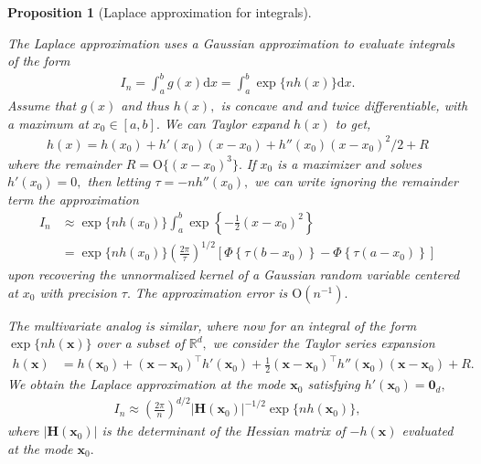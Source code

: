 \documentclass[
  11pt,
  letterpaper,
]{scrbook}
\theoremstyle{plain}
\newtheorem{proposition}{Proposition}[chapter]
\theoremstyle{definition}
\theoremstyle{definition}
\theoremstyle{plain}
\theoremstyle{plain}
\theoremstyle{definition}
\theoremstyle{remark}
\begin{document}
\begin{proposition}[Laplace approximation for
integrals]\protect\hypertarget{prp-Laplace-approximation}{}\label{prp-Laplace-approximation}

The Laplace approximation uses a Gaussian approximation to evaluate
integrals of the form \begin{align*}
I_n= \int_a^b g(x) \mathrm{d} x =\int_a^b  \exp\{nh(x)\}\mathrm{d} x.
\end{align*} Assume that \(g(x)\) and thus \(h(x),\) is concave and and
twice differentiable, with a maximum at \(x_0 \in [a,b].\) We can Taylor
expand \(h(x)\) to get, \begin{align*}
h(x) = h(x_0) + h'(x_0)(x-x_0) + h''(x_0)(x-x_0)^2/2 + R
\end{align*} where the remainder \(R=\mathrm{O}\{(x-x_0)^3\}.\) If
\(x_0\) is a maximizer and solves \(h'(x_0)=0,\) then letting
\(\tau=-nh''(x_0),\) we can write ignoring the remainder term the
approximation \begin{align*}
 I_n &\approx \exp\{nh(x_0)\} \int_{a}^b \exp \left\{-\frac{1}{2}(x-x_0)^2\right\}
  \\&= \exp\{nh(x_0)\} \left(\frac{2\pi}{\tau}\right)^{1/2} \left[\Phi\left\{ \tau(b-x_0)\right\} - \Phi\left\{\tau(a-x_0)\right\}\right]
\end{align*} upon recovering the unnormalized kernel of a Gaussian
random variable centered at \(x_0\) with precision \(\tau.\) The
approximation error is \(\mathrm{O}(n^{-1}).\)

The multivariate analog is similar, where now for an integral of the
form \(\exp\{nh(\boldsymbol{x})\}\) over a subset of \(\mathbb{R}^d,\)
we consider the Taylor series expansion \begin{align*}
 h(\boldsymbol{x}) &= h(\boldsymbol{x}_0) + (\boldsymbol{x}- \boldsymbol{x}_0)^\top h'(\boldsymbol{x}_0) + \frac{1}{2}(\boldsymbol{x}- \boldsymbol{x}_0)^\top h''(\boldsymbol{x}_0)(\boldsymbol{x}- \boldsymbol{x}_0) + R.
\end{align*} We obtain the Laplace approximation at the mode
\(\boldsymbol{x}_0\) satisfying
\(h'(\boldsymbol{x}_0)=\boldsymbol{0}_d,\) \begin{align*}
 I_n \approx \left(\frac{2\pi}{n}\right)^{d/2} | \mathbf{H}(\boldsymbol{x}_0)|^{-1/2}\exp\{nh(\boldsymbol{x}_0)\},
\end{align*} where \(|\mathbf{H}(\boldsymbol{x}_0)|\) is the determinant
of the Hessian matrix of \(-h(\boldsymbol{x})\) evaluated at the mode
\(\boldsymbol{x}_0.\)

\end{proposition}
\end{document}
